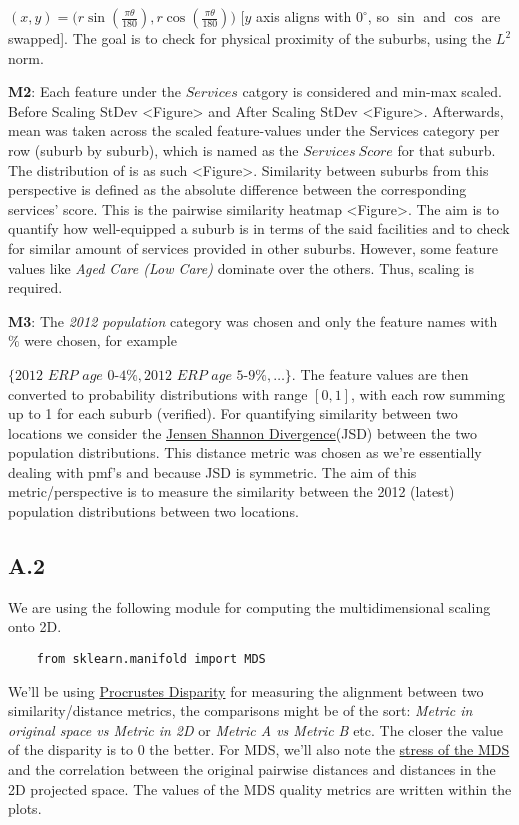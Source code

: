 \documentclass[
	a4paper, %
	10pt, %
	unnumberedsections, %
	twoside, %
]{LTJournalArticle}
\begin{document}
$(x, y) = \big(r\sin\left(\frac{\pi\theta}{180}\right), r\cos\left(\frac{\pi\theta}{180}\right)\big)$ [$y$ axis aligns with $0^\circ$, so $\sin$ and $\cos$ are swapped]. The goal is to check for physical proximity of the suburbs, using the $L^2$ norm.

\textbf{M2}: Each feature under the $Services$ catgory is considered and min-max scaled. Before Scaling StDev <Figure> and After Scaling StDev <Figure>. Afterwards, mean was taken across the scaled feature-values under the Services category per row (suburb by suburb), which is named as the $Services \ Score$ for that suburb. The distribution of is as such <Figure>. Similarity between suburbs from this perspective is defined as the absolute difference between the corresponding services' score. This is the pairwise similarity heatmap <Figure>. The aim is to quantify how well-equipped a suburb is in terms of the said facilities and to check for similar amount of services provided in other suburbs. However, some feature values like \textit{Aged Care (Low Care)} dominate over the others. Thus, scaling is required. 

\textbf{M3}: The \textit{2012 population} category was chosen and only the feature names with $\%$ were chosen, for example

$\{ \textit{2012 ERP age 0-4\%}, \textit{2012 ERP age 5-9\%}, \dots\}$. The feature values are then converted to probability distributions with range $[0,1]$, with each row summing up to 1 for each suburb (verified). For quantifying similarity between two locations we consider the \href{https://en.wikipedia.org/wiki/Jensen%E2%80%93Shannon_divergence}{Jensen Shannon Divergence}(JSD) between the two population distributions. This distance metric was chosen as we're essentially dealing with pmf's and because JSD is symmetric. The aim of this metric/perspective is to measure the similarity between the 2012 (latest) population distributions between two locations.



\subsection{A.2}

We are using the following module for computing the multidimensional scaling onto 2D.
\begin{verbatim}
    from sklearn.manifold import MDS
\end{verbatim}

We'll be using \href{https://en.wikipedia.org/wiki/Procrustes_analysis}{Procrustes Disparity} for measuring the alignment between two similarity/distance metrics, the comparisons might be of the sort: \textit{Metric in original space vs Metric in 2D} or \textit{Metric A vs Metric B} etc. The closer the value of the disparity is to 0 the better. For MDS, we'll also note the \href{https://imaging.mrc-cbu.cam.ac.uk/statswiki/FAQ/mds/stress#:~:text=The%20measure%20of%20goodness%20of,or%20more%20estimated%20stimuli%20dimensions}{stress of the MDS} and the correlation between the original pairwise distances and distances in the 2D projected space. The values of the MDS quality metrics are written within the plots.
\end{document}
